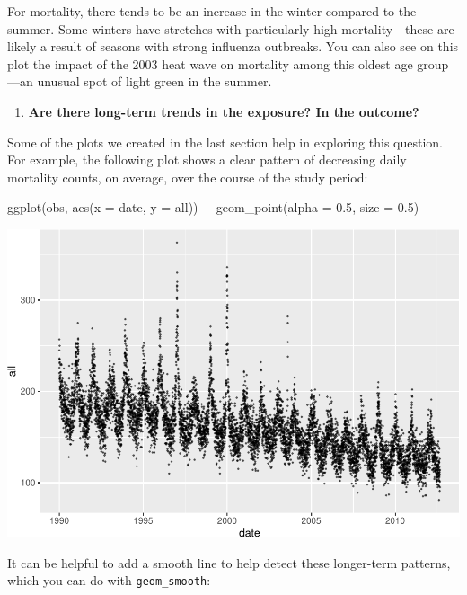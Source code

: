 \documentclass[
]{book}
\newenvironment{Shaded}{\begin{snugshade}}{\end{snugshade}}
\newcommand{\AttributeTok}[1]{\textcolor[rgb]{0.77,0.63,0.00}{#1}}
\newcommand{\FloatTok}[1]{\textcolor[rgb]{0.00,0.00,0.81}{#1}}
\newcommand{\FunctionTok}[1]{\textcolor[rgb]{0.00,0.00,0.00}{#1}}
\newcommand{\NormalTok}[1]{#1}
\newcommand{\SpecialCharTok}[1]{\textcolor[rgb]{0.00,0.00,0.00}{#1}}
\providecommand{\tightlist}{%
  \setlength{\itemsep}{0pt}\setlength{\parskip}{0pt}}
\begin{document}
For mortality, there tends to be an increase in the winter compared to the summer.
Some winters have stretches with particularly high mortality---these are likely
a result of seasons with strong influenza outbreaks. You can also see on this
plot the impact of the 2003 heat wave on mortality among this oldest age group---an
unusual spot of light green in the summer.

\begin{enumerate}
\def\labelenumi{\arabic{enumi}.}
\setcounter{enumi}{3}
\tightlist
\item
  \textbf{Are there long-term trends in the exposure? In the outcome?}
\end{enumerate}

Some of the plots we created in the last section help in exploring this
question. For example, the following plot shows a clear pattern of decreasing
daily mortality counts, on average, over the course of the study period:

\begin{Shaded}
\begin{Highlighting}[]
\FunctionTok{ggplot}\NormalTok{(obs, }\FunctionTok{aes}\NormalTok{(}\AttributeTok{x =}\NormalTok{ date, }\AttributeTok{y =}\NormalTok{ all)) }\SpecialCharTok{+} 
  \FunctionTok{geom\_point}\NormalTok{(}\AttributeTok{alpha =} \FloatTok{0.5}\NormalTok{, }\AttributeTok{size =} \FloatTok{0.5}\NormalTok{)}
\end{Highlighting}
\end{Shaded}

\includegraphics{adv_epi_analysis_files/figure-latex/unnamed-chunk-14-1.pdf}

It can be helpful to add a smooth line to help detect these longer-term
patterns, which you can do with \texttt{geom\_smooth}:
\end{document}
